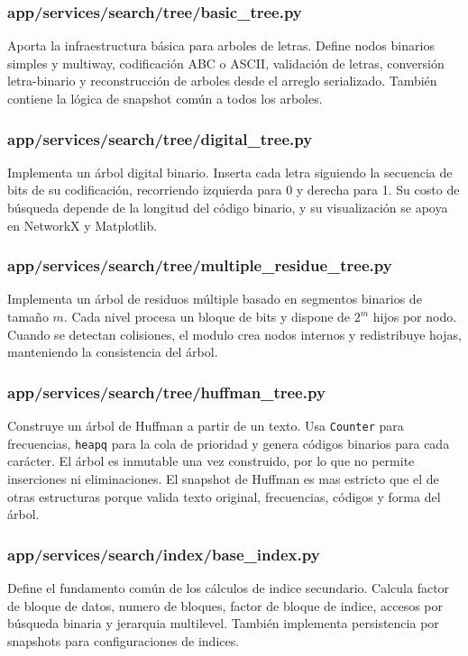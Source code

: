 \documentclass[12pt,onecolumn]{IEEEtran}
\begin{document}
\subsubsection{app/services/search/tree/basic\_tree.py}
Aporta la infraestructura básica para arboles de letras. Define nodos binarios simples y multiway, codificación ABC o ASCII, validación de letras, conversión letra-binario y reconstrucción de arboles desde el arreglo serializado. También contiene la lógica de snapshot común a todos los arboles.

\subsubsection{app/services/search/tree/digital\_tree.py}
Implementa un árbol digital binario. Inserta cada letra siguiendo la secuencia de bits de su codificación, recorriendo izquierda para 0 y derecha para 1. Su costo de búsqueda depende de la longitud del código binario, y su visualización se apoya en NetworkX y Matplotlib.

\subsubsection{app/services/search/tree/multiple\_residue\_tree.py}
Implementa un árbol de residuos múltiple basado en segmentos binarios de tamaño \(m\). Cada nivel procesa un bloque de bits y dispone de \(2^m\) hijos por nodo. Cuando se detectan colisiones, el modulo crea nodos internos y redistribuye hojas, manteniendo la consistencia del árbol.

\subsubsection{app/services/search/tree/huffman\_tree.py}
Construye un árbol de Huffman a partir de un texto. Usa \texttt{Counter} para frecuencias, \texttt{heapq} para la cola de prioridad y genera códigos binarios para cada carácter. El árbol es inmutable una vez construido, por lo que no permite inserciones ni eliminaciones. El snapshot de Huffman es mas estricto que el de otras estructuras porque valida texto original, frecuencias, códigos y forma del árbol.

\subsubsection{app/services/search/index/base\_index.py}
Define el fundamento común de los cálculos de indice secundario. Calcula factor de bloque de datos, numero de bloques, factor de bloque de indice, accesos por búsqueda binaria y jerarquia multilevel. También implementa persistencia por snapshots para configuraciones de indices.
\end{document}

